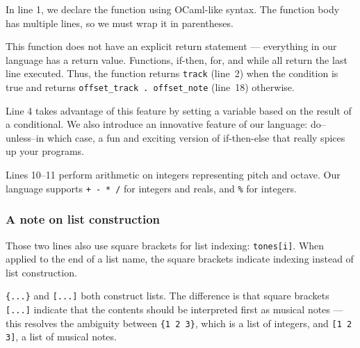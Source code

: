 \documentclass[11pt, onecolumn, letterpaper]{article}
\begin{document}
In line 1, we declare the function using OCaml-like syntax. The function body has multiple lines, so we must wrap it in parentheses. 

This function does not have an explicit return statement --- everything in our language has a return value. Functions, if-then, for, and while all return the last line executed. Thus, the function returns \texttt{track} (line~2) when the condition is true and returns \texttt{offset\_track . offset\_note} (line~18) otherwise. 

Line 4 takes advantage of this feature by setting a variable based on the result of a conditional. We also introduce an innovative feature of our language: do--unless--in which case, a fun and exciting version of if-then-else that really spices up your programs. 

Lines 10--11 perform arithmetic on integers representing pitch and octave. Our language supports \texttt{+}~\texttt{-}~\texttt{*}~\texttt{/} for integers and reals, and \texttt{\%} for integers. 

\subsubsection{A note on list construction}

Those two lines also use square brackets for list indexing: \texttt{tones[i]}. When applied to the end of a list name, the square brackets indicate indexing instead of list construction. 

\texttt{\{...\}} and \texttt{[...]} both construct lists. The difference is that square brackets \texttt{[...]} indicate that the contents should be interpreted first as musical notes --- this resolves the ambiguity between \texttt{\{1 2 3\}}, which is a list of integers, and \texttt{[1 2 3]}, a list of musical notes. 
\end{document}
